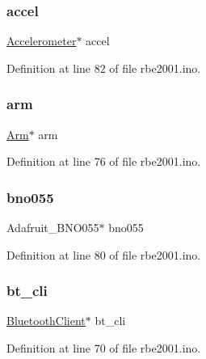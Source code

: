\subsubsection{\texorpdfstring{accel}{accel}}
{\footnotesize\ttfamily \hyperlink{class_accelerometer}{Accelerometer}$\ast$ accel}



Definition at line 82 of file rbe2001.\+ino.

\mbox{\label{rbe2001_8ino_a0f9200eb3ef3d09764dc39b137dc9f45}} 
\subsubsection{\texorpdfstring{arm}{arm}}
{\footnotesize\ttfamily \hyperlink{class_arm}{Arm}$\ast$ arm}



Definition at line 76 of file rbe2001.\+ino.

\mbox{\label{rbe2001_8ino_ab36eee53161180375c1855b5917ec0f9}} 
\subsubsection{\texorpdfstring{bno055}{bno055}}
{\footnotesize\ttfamily Adafruit\+\_\+\+B\+N\+O055$\ast$ bno055}



Definition at line 80 of file rbe2001.\+ino.

\mbox{\label{rbe2001_8ino_ae2ff51c6b65a5b568253ca01270200bc}} 
\subsubsection{\texorpdfstring{bt\+\_\+cli}{bt\_cli}}
{\footnotesize\ttfamily \hyperlink{class_bluetooth_client}{Bluetooth\+Client}$\ast$ bt\+\_\+cli}



Definition at line 70 of file rbe2001.\+ino.

\mbox{\label{rbe2001_8ino_a4f1a93864d6efcbbe55f30028655e7ad}} 
